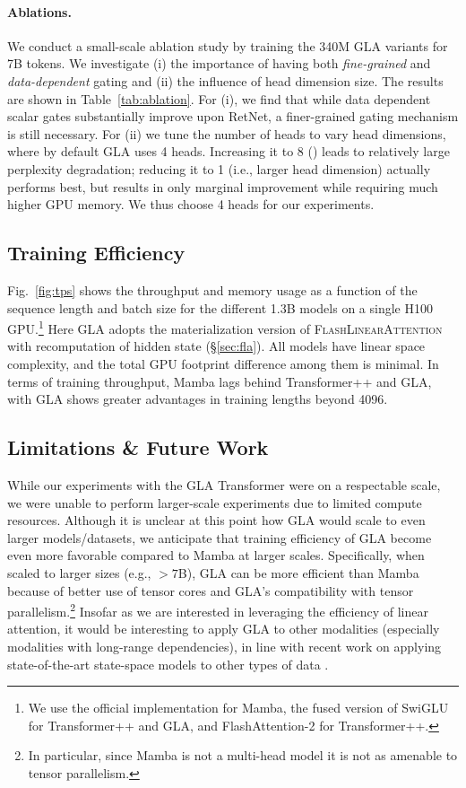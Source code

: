 \paragraph{Ablations.}
We conduct a small-scale ablation study by training the 340M GLA variants for 7B tokens. We investigate (i) the importance of having both \emph{fine-grained} and \emph{data-dependent} gating  and (ii) the influence of head dimension size. The results are shown in Table~\ref{tab:ablation}. For (i), we find that while data dependent scalar gates substantially improve upon RetNet, a finer-grained gating mechanism is still necessary. For (ii) we tune the number of heads to vary head dimensions, where by default GLA uses 4 heads. Increasing it to 8 () leads to relatively large perplexity degradation; reducing it to 1 (i.e., larger head dimension) actually performs best, but results in only marginal improvement while requiring much higher GPU memory. We thus choose 4 heads for our experiments.

\subsection{Training Efficiency}

Fig.~\ref{fig:tps} shows the throughput and memory usage as a function of the sequence length and batch size for the different 1.3B models on a single H100 GPU.\footnote{We use the official implementation for Mamba, the fused version of SwiGLU  for Transformer++ and GLA, and FlashAttention-2 for Transformer++.} Here GLA adopts the materialization version of \textsc{FlashLinearAttention} with recomputation of hidden state (\S\ref{sec:fla}). All models have linear space complexity, and the total GPU footprint difference among them is minimal. In terms of training throughput, Mamba  lags behind Transformer++ and GLA, with GLA shows greater advantages in training lengths beyond 4096.

\subsection{Limitations \& Future Work}

While our experiments with the GLA Transformer were on a respectable scale, we were unable to perform larger-scale experiments due to limited compute resources. Although it is unclear at this point how GLA would scale to even larger models/datasets, we anticipate that training efficiency of GLA become even more favorable compared to Mamba at larger scales. Specifically, when scaled to larger sizes (e.g., $>7$B), GLA can be more efficient than Mamba because of better use of tensor cores and GLA's compatibility with tensor parallelism.\footnote{In particular, since Mamba is not a  multi-head model it is not as amenable to tensor parallelism.} Insofar as we are interested in leveraging the efficiency of linear attention, it would be interesting to apply GLA to other modalities (especially modalities with long-range dependencies), in line with recent work on applying state-of-the-art state-space models to other types of data \citep[][\textit{inter alia}]{Yan2023DiffusionMW, zhu2024vision,ma2024u,liu2024vmamba,xing2024segmamba,wang2024graph,wang2024mambabyte,yang2024vivim}.

